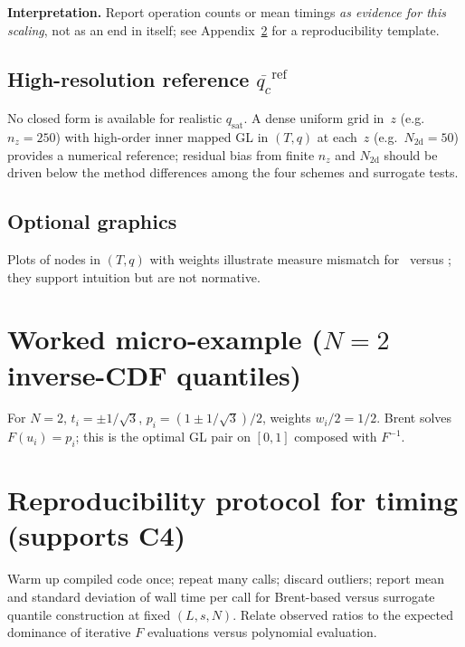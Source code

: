 \documentclass[11pt,a4paper]{article}
\begin{document}
\textbf{Interpretation.}
Report operation counts or mean timings \emph{as evidence for this scaling}, not as an end in itself; see Appendix~\ref{app:repro} for a reproducibility template.

\subsection{\texorpdfstring{High-resolution reference $\overline{q_c}^{\mathrm{ref}}$}{High-resolution reference for layer-mean qc}}
\label{sec:qcref}
No closed form is available for realistic $q_{\mathrm{sat}}$.
A dense uniform grid in~$z$ (e.g.\ $n_z=250$) with high-order inner mapped GL in $(T,q)$ at each~$z$ (e.g.\ $N_{2\mathrm{d}}=50$) provides a numerical reference; residual bias from finite $n_z$ and $N_{2\mathrm{d}}$ should be driven below the method differences among the four schemes and surrogate tests.

\subsection{Optional graphics}
Plots of nodes in $(T,q)$ with weights illustrate measure mismatch for \momentmatched\ versus \profileros; they support intuition but are not normative.

\section{\texorpdfstring{Worked micro-example ($N=2$ inverse-CDF quantiles)}{Worked micro-example N equals 2 inverse-CDF quantiles}}
For $N=2$, $t_i=\pm 1/\sqrt{3}$, $p_i=(1\pm 1/\sqrt{3})/2$, weights $w_i/2=1/2$.
Brent solves $F(u_i)=p_i$; this is the optimal GL pair on $[0,1]$ composed with $F^{-1}$.

\appendix

\section{Reproducibility protocol for timing (supports C4)}
\label{app:repro}
Warm up compiled code once; repeat many calls; discard outliers; report mean and standard deviation of wall time per call for Brent-based versus surrogate quantile construction at fixed $(L,s,N)$.
Relate observed ratios to the expected dominance of iterative $F$ evaluations versus polynomial evaluation.
\end{document}
